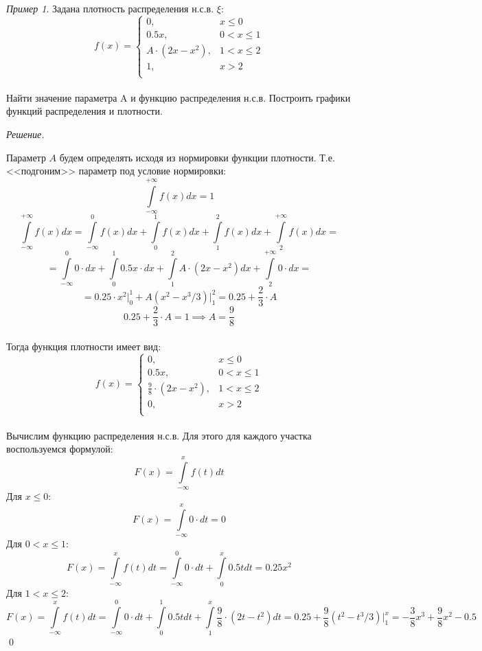 \documentclass[12pt,a4paper]{article}
\theoremstyle{definition}
\theoremstyle{definition}
\theoremstyle{remark}
\theoremstyle{corollary}
\theoremstyle{bolditalic}
\newtheorem{example}{Пример}[section]
\newenvironment{solution}{
    \vspace{0.5em}
    \noindent\textit{Решение.}
}{\qed\vspace{1em}}
\begin{document}
\begin{example}
    Задана плотность распределения н.с.в. $\xi$:\\
    \[
    f(x) = \begin{cases}
      0, & x \le 0 \\
      0.5x, & 0 < x \le  1\\
      A\cdot (2x-x^2), & 1 < x \le 2 \\
      1, & x > 2 \\
    \end{cases}
    \]
    \\
    Найти значение параметра A и функцию распределения н.с.в. Построить графики функций распределения и плотности.
\end{example}
\begin{solution}
    Параметр $A$ будем определять исходя из нормировки функции плотности. Т.е. <<подгоним>> параметр под условие нормировки:
     \[
     \int\limits_{-\infty}^{+\infty}{f(x)dx} = 1
     \]
     \[
     \int\limits_{-\infty}^{+\infty}{f(x)dx} = \int\limits_{-\infty}^{0}{f(x)dx} + \int\limits_{0}^{1}{f(x)dx} + \int\limits_{1}^{2}{f(x)dx}+ \int\limits_{2}^{+\infty}{f(x)dx}=
     \]
     \[
     =\int\limits_{-\infty}^{0}{0\cdot dx} + \int\limits_{0}^{1}{0.5x\cdot dx} + \int\limits_{1}^{2}{A\cdot (2x-x^2)dx}+ \int\limits_{2}^{+\infty}{0\cdot dx}=
     \]
     \[
     =0.25\cdot x^2 \Big|_{0}^{1}+A(x^2-x^3/3)\Big|_{1}^{2}=0.25+\frac{2}{3}\cdot A 
     \]
     \[
     0.25+\frac{2}{3}\cdot A =1 \implies A= \frac{9}{8}
     \]
     \\
     Тогда функция плотности имеет вид:
     \[
     f(x) = \begin{cases}
      0, & x \le 0 \\
      0.5x, & 0 < x \le  1\\
      \frac{9}{8}\cdot (2x-x^2), & 1 < x \le 2 \\
      0, & x > 2 \\
    \end{cases}
     \]
     \\
     Вычислим функцию распределения н.с.в. Для этого для каждого участка воспользуемся формулой:
     \[
     F(x) = \int\limits_{-\infty}^{x}{f(t)dt}
     \]
     Для $x \le 0$:
     \[
     F(x)=\int\limits_{-\infty}^{x}{0\cdot dt} = 0
     \]
     Для $0 < x \le 1$:
     \[
     F(x)=\int\limits_{-\infty}^{x}{f(t) dt} = \int\limits_{-\infty}^{0}{0\cdot dt} + \int\limits_{0}^{x}{0.5t dt}=0.25x^2
     \]
     Для $1 < x \le 2$:
     \[
     F(x)=\int\limits_{-\infty}^{x}{f(t) dt} = \int\limits_{-\infty}^{0}{0\cdot dt} + \int\limits_{0}^{1}{0.5t dt} + \int\limits_{1}^{x}{\frac{9}{8}\cdot (2t-t^2) dt}=0.25+\frac{9}{8}(t^2-t^3/3)\Big|_{1}^{x}=-\frac{3}{8}x^3+\frac{9}{8}x^2-0.5
\]
\end{solution}
\end{document}
